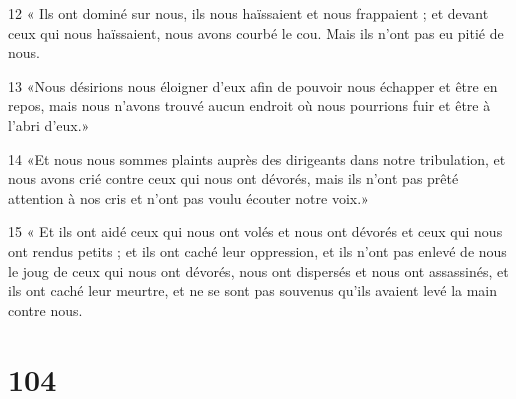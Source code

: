 \par 12 « Ils ont dominé sur nous, ils nous haïssaient et nous frappaient ; et devant ceux qui nous haïssaient, nous avons courbé le cou. Mais ils n'ont pas eu pitié de nous.
\par 13 «Nous désirions nous éloigner d'eux afin de pouvoir nous échapper et être en repos, mais nous n'avons trouvé aucun endroit où nous pourrions fuir et être à l'abri d'eux.»
\par 14 «Et nous nous sommes plaints auprès des dirigeants dans notre tribulation, et nous avons crié contre ceux qui nous ont dévorés, mais ils n'ont pas prêté attention à nos cris et n'ont pas voulu écouter notre voix.»
\par 15 « Et ils ont aidé ceux qui nous ont volés et nous ont dévorés et ceux qui nous ont rendus petits ; et ils ont caché leur oppression, et ils n'ont pas enlevé de nous le joug de ceux qui nous ont dévorés, nous ont dispersés et nous ont assassinés, et ils ont caché leur meurtre, et ne se sont pas souvenus qu'ils avaient levé la main contre nous.

\chapter{104}

